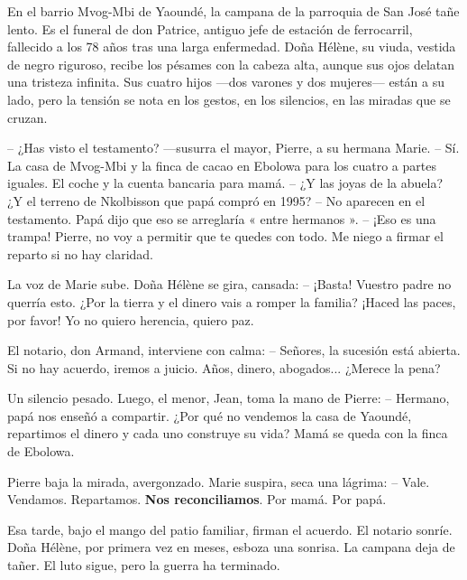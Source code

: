 \documentclass[11pt]{article}
\begin{document}
\begin{textebox}
En el barrio Mvog-Mbi de Yaoundé, la campana de la parroquia de San José tañe lento. Es el funeral de don Patrice, antiguo jefe de estación de ferrocarril, fallecido a los 78 años tras una larga enfermedad. Doña Hélène, su viuda, vestida de negro riguroso, recibe los pésames con la cabeza alta, aunque sus ojos delatan una tristeza infinita. Sus cuatro hijos —dos varones y dos mujeres— están a su lado, pero la tensión se nota en los gestos, en los silencios, en las miradas que se cruzan.

-- ¿Has visto el testamento? —susurra el mayor, Pierre, a su hermana Marie.
-- Sí. La casa de Mvog-Mbi y la finca de cacao en Ebolowa para los cuatro a partes iguales. El coche y la cuenta bancaria para mamá.
-- ¿Y las joyas de la abuela? ¿Y el terreno de Nkolbisson que papá compró en 1995?
-- No aparecen en el testamento. Papá dijo que eso se arreglaría « entre hermanos ».
-- ¡Eso es una trampa! Pierre, no voy a permitir que te quedes con todo. Me niego a firmar el reparto si no hay claridad.

La voz de Marie sube. Doña Hélène se gira, cansada:
-- ¡Basta! Vuestro padre no querría esto. ¿Por la tierra y el dinero vais a romper la familia? ¡Haced las paces, por favor! Yo no quiero herencia, quiero paz.

El notario, don Armand, interviene con calma:
-- Señores, la sucesión está abierta. Si no hay acuerdo, iremos a juicio. Años, dinero, abogados... ¿Merece la pena?

Un silencio pesado. Luego, el menor, Jean, toma la mano de Pierre:
-- Hermano, papá nos enseñó a compartir. ¿Por qué no vendemos la casa de Yaoundé, repartimos el dinero y cada uno construye su vida? Mamá se queda con la finca de Ebolowa.

Pierre baja la mirada, avergonzado. Marie suspira, seca una lágrima:
-- Vale. Vendamos. Repartamos. \textbf{Nos reconciliamos}. Por mamá. Por papá.

Esa tarde, bajo el mango del patio familiar, firman el acuerdo. El notario sonríe. Doña Hélène, por primera vez en meses, esboza una sonrisa. La campana deja de tañer. El luto sigue, pero la guerra ha terminado.
\end{textebox}
\end{document}
